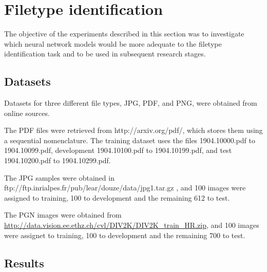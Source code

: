\section{Filetype identification}
The objective of the experiments described in this section was to investigate which neural network models would be more adequate to the filetype identification task and to be used in subsequent research stages.
\subsection{Datasets}

Datasets for three different file types, JPG, PDF, and PNG, were obtained from online sources.

The PDF files were retrieved from http://arxiv.org/pdf/, which stores them using a sequential nomenclature. The training dataset uses the files 1904.10000.pdf to 1904.10099.pdf, development 1904.10100.pdf to 1904.10199.pdf, and test 1904.10200.pdf to 1904.10299.pdf. 

The JPG samples were obtained in ftp://ftp.inrialpes.fr/pub/lear/douze/data/jpg1.tar.gz , and 100 images were assigned to training, 100 to development and the remaining 612 to test.

The PGN images were obtained from \url{http://data.vision.ee.ethz.ch/cvl/DIV2K/DIV2K_train_HR.zip}, and 100 images were assignet to training, 100 to development and the remaining 700 to test.


\subsection{Results}






